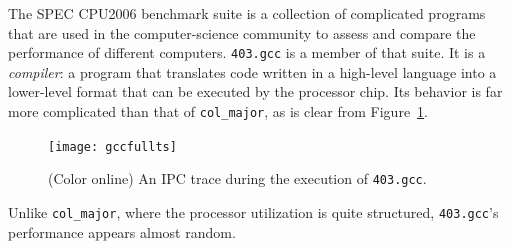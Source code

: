 \documentclass[%
pre,
reprint,
superscriptaddress,
showpacs,
nofootinbib,
nobibnotes,
 amsmath,amssymb,
 aps,
]{revtex4-1}
\newcommand{\gcc}{{\tt 403.gcc}\xspace}
\newcommand{\col}{{\tt col\_major}\xspace}
\begin{document}
% 
%   

The SPEC CPU2006 benchmark suite \cite{spec} is a collection of
complicated programs that are used in the computer-science community
to assess and compare the performance of different computers.  \gcc is
a member of that suite.
% 
% 
It is a \emph{compiler}: a program that translates code written in a
high-level language 
into a lower-level format that can be executed by the processor chip.
Its behavior is far more complicated than that of \col, as is clear
from Figure~\ref{fig:gcc-ts}.
  \begin{figure}[t]
  \centering
    \texttt{[image: gccfullts]}
    \caption{(Color online) An IPC trace during the execution of \gcc.}
    \label{fig:gcc-ts}
  \end{figure}
Unlike \col, where the processor utilization is quite structured,
\gcc's performance appears almost random.
\end{document}
